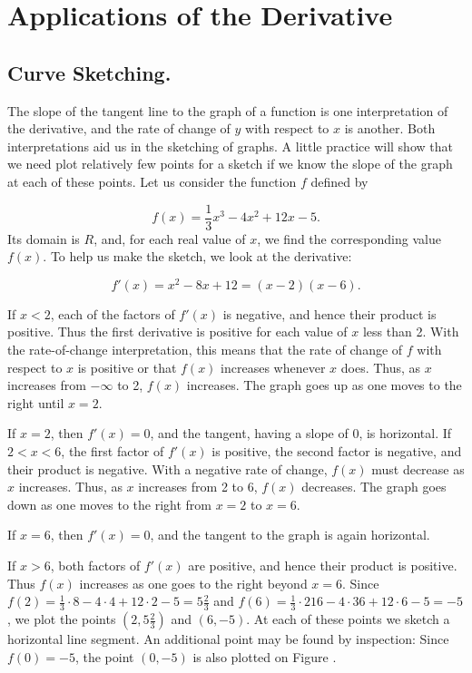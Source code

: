 \chapter{Applications of the Derivative} \label{chp 2}

\section{Curve Sketching.}\label{sec 2.1}
The slope of the tangent line to the graph of a function is one interpretation of the derivative, and the rate of change of $y$ with respect to $x$ is another. Both interpretations aid us in the sketching of graphs. A little practice will show that we need plot relatively few points for a sketch if we know the slope of the graph at each of these points. Let us consider the function $f$ defined by

$$
f(x) = \frac{1}{3} x^3 - 4x^2 + 12x - 5.
$$
Its domain is $R$, and, for each real value of $x$, we find the corresponding value $f(x)$. To help us make the sketch, we look at the derivative:

$$
f'(x) = x^2 - 8x + 12 = (x - 2)(x - 6).
$$

If $x < 2$, each of the factors of $f'(x)$ is negative, and hence their product is positive. Thus the first derivative is positive for each value of $x$ less than 2. With the rate-of-change interpretation, this means that the rate of change of $f$ with respect to $x$ is positive or that $f(x)$ increases whenever $x$ does. Thus, as $x$ increases from $-\infty$ to 2, $f(x)$ increases. The graph goes up as one moves to the right until $x = 2$.

If $x = 2$, then $f'(x) = 0$, and the tangent, having a slope of 0, is horizontal. If $2 < x < 6$, the first factor of $f'(x)$ is positive, the second factor is negative, and their product is negative. With a negative rate of change, $f(x)$ must decrease as $x$ increases. Thus, as $x$ increases from 2 to 6, $f(x)$ decreases. The graph goes down as one moves to the right from $x = 2$ to $x= 6$.

If $x = 6$, then $f'(x) = 0$, and the tangent to the graph is again horizontal.

If $x > 6$, both factors of $f'(x)$ are positive, and hence their product is positive. Thus $f(x)$ increases as one goes to the right beyond $x = 6$. 
Since $f(2) = \frac{1}{3} \cdot 8 - 4 \cdot 4 + 12 \cdot 2 - 5 = 5\frac{2}{3}$ and $f(6) = \frac{1}{3} \cdot 216 - 4 \cdot 36 + 12 \cdot 6 - 5 = -5$, we plot the points $(2, 5\frac{2}{3})$ and $(6, -5)$. At each of these points we sketch a horizontal line segment. An additional point may be found by inspection: Since $f(0) = -5$, the point $(0, -5)$ is also plotted on Figure .

